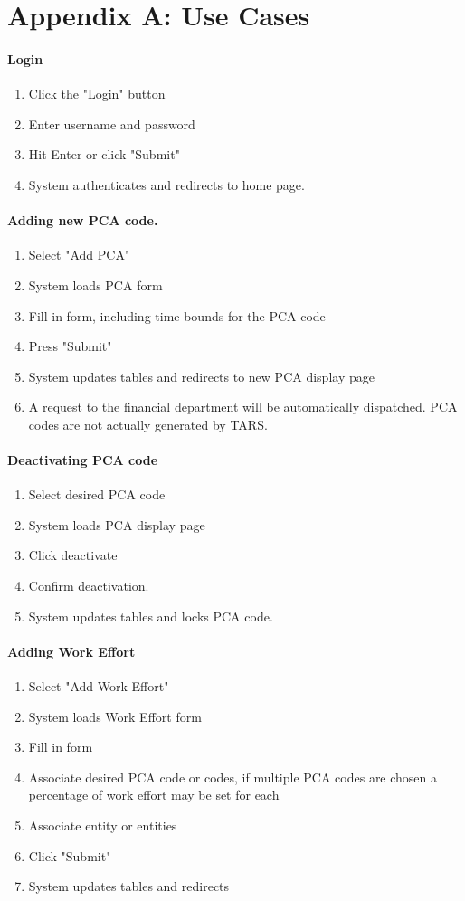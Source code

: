 \documentclass[letterpaper]{article}
\begin{document}
\section{Appendix A: Use Cases} 
\paragraph{Login}
\begin{enumerate}
\item Click the "Login" button
\item Enter username and password
\item Hit Enter or click "Submit"
\item System authenticates and redirects to home page.
\end{enumerate}

\paragraph{Adding new PCA code.}
\begin{enumerate}
\item Select "Add PCA"
\item System loads PCA form
\item Fill in form, including time bounds for the PCA code
\item Press "Submit"
\item System updates tables and redirects to new PCA display page
\item A request to the financial department will be automatically dispatched. PCA codes are not actually generated by TARS.
\end{enumerate}

\paragraph{Deactivating PCA code}
\begin{enumerate}
\item Select desired PCA code
\item System loads PCA display page
\item Click deactivate
\item Confirm deactivation.
\item System updates tables and locks PCA code.
\end{enumerate}

\paragraph{Adding Work Effort}
\begin{enumerate}
\item Select "Add Work Effort"
\item System loads Work Effort form
\item Fill in form
\item Associate desired PCA code or codes, if multiple PCA codes are chosen a percentage of work effort may be set for each
\item Associate entity or entities
\item Click "Submit"
\item System updates tables and redirects
\end{enumerate}
\end{document}
